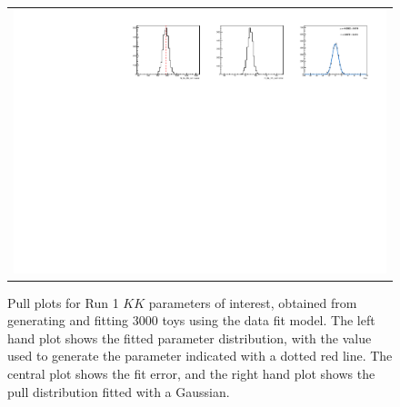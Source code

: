\begin{figure}
\begin{tabular}{c}
\includegraphics[width=\textwidth]{ANA_resources/Plots/Data_fit/FitterBias//N_Bs_KK_run1.pdf} \\
  \end{tabular}
  \caption{Pull plots for Run 1 $KK$ parameters of interest, obtained from generating and fitting 3000 toys using the data fit model. The left hand plot shows the fitted parameter distribution, with the value used to generate the parameter indicated with a dotted red line. The central plot shows the fit error, and the right hand plot shows the pull distribution fitted with a Gaussian.}
\label{fig:KK_run1_pulls}
\end{figure}
